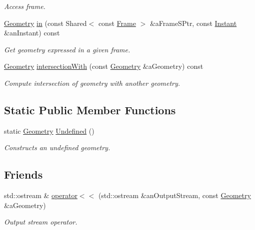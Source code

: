 \begin{DoxyCompactItemize}
\begin{DoxyCompactList}\small\item\em Access frame. \end{DoxyCompactList}\item 
\hyperlink{classlibrary_1_1physics_1_1env_1_1object_1_1_geometry}{Geometry} \hyperlink{classlibrary_1_1physics_1_1env_1_1object_1_1_geometry_a3538be01a00bf3aae3c1fbc0e7f4fb6b}{in} (const Shared$<$ const \hyperlink{classlibrary_1_1physics_1_1coord_1_1_frame}{Frame} $>$ \&a\+Frame\+S\+Ptr, const \hyperlink{classlibrary_1_1physics_1_1time_1_1_instant}{Instant} \&an\+Instant) const
\begin{DoxyCompactList}\small\item\em Get geometry expressed in a given frame. \end{DoxyCompactList}\item 
\hyperlink{classlibrary_1_1physics_1_1env_1_1object_1_1_geometry}{Geometry} \hyperlink{classlibrary_1_1physics_1_1env_1_1object_1_1_geometry_a2fccc85beb614199e87a44546c397f7c}{intersection\+With} (const \hyperlink{classlibrary_1_1physics_1_1env_1_1object_1_1_geometry}{Geometry} \&a\+Geometry) const
\begin{DoxyCompactList}\small\item\em Compute intersection of geometry with another geometry. \end{DoxyCompactList}\end{DoxyCompactItemize}
\subsection*{Static Public Member Functions}
\begin{DoxyCompactItemize}
\item 
static \hyperlink{classlibrary_1_1physics_1_1env_1_1object_1_1_geometry}{Geometry} \hyperlink{classlibrary_1_1physics_1_1env_1_1object_1_1_geometry_a5e02f2d9a9a6ac2686f49780811d0fe2}{Undefined} ()
\begin{DoxyCompactList}\small\item\em Constructs an undefined geometry. \end{DoxyCompactList}\end{DoxyCompactItemize}
\subsection*{Friends}
\begin{DoxyCompactItemize}
\item 
std\+::ostream \& \hyperlink{classlibrary_1_1physics_1_1env_1_1object_1_1_geometry_aebfe5b9b5d8cd3dd8a2cfd140a1df583}{operator$<$$<$} (std\+::ostream \&an\+Output\+Stream, const \hyperlink{classlibrary_1_1physics_1_1env_1_1object_1_1_geometry}{Geometry} \&a\+Geometry)
\begin{DoxyCompactList}\small\item\em Output stream operator. \end{DoxyCompactList}\end{DoxyCompactItemize}


